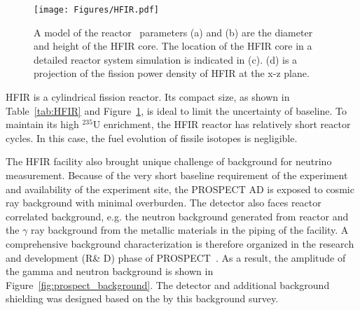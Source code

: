 \begin{figure}
    \centering
    \texttt{[image: Figures/HFIR.pdf]}
    \caption[The dimensions and power distribution of HFIR]{A model of the reactor~\cite{bib:prospect_nim} parameters (a) and (b) are the diameter and height of the HFIR core.
    The location of the HFIR core in a detailed reactor system simulation is indicated in (c).
    (d) is a projection of the fission power density of HFIR at the x-z plane.}
    \label{fig:HFIR}
\end{figure}

    HFIR is a cylindrical fission reactor.
    Its compact size, as shown in Table~\ref{tab:HFIR} and Figure~\ref{fig:HFIR}, is ideal to limit the uncertainty of baseline.
    To maintain its high $^{235}$U enrichment, the HFIR reactor has relatively short reactor cycles.
    In this case, the fuel evolution of fissile isotopes is negligible.
    
    The HFIR facility also brought unique challenge of background for neutrino measurement. 
    Because of the very short baseline requirement of the experiment and availability of the experiment site, the PROSPECT AD is exposed to cosmic ray background with minimal overburden. 
    The detector also faces reactor correlated background, e.g. the neutron background generated from reactor and the $\gamma$ ray background from the metallic materials in the piping of the facility.
    A comprehensive background characterization is therefore organized in the research and development (R\& D) phase of PROSPECT~\cite{bib:prospect_background}. 
    As a result, the amplitude of the gamma and neutron background is shown in Figure~\ref{fig:prospect_background}.
    The detector and additional background shielding was designed based on the by this background survey.
    
